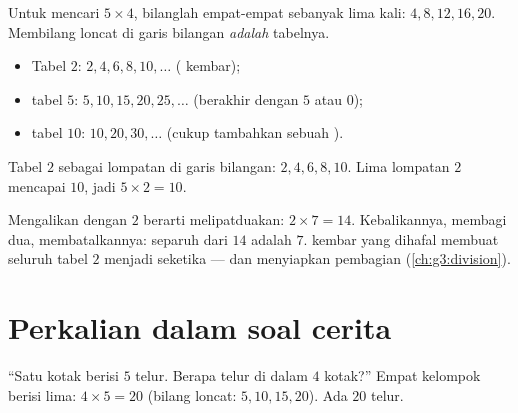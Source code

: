\begin{method}\label{met:g2:mult:skip}
Untuk mencari $5 \times 4$, bilanglah empat-empat sebanyak lima kali:
$4, 8, 12, 16, 20$. Membilang loncat di garis bilangan \emph{adalah}
tabelnya.
\begin{itemize}
  \item Tabel $2$: $2, 4, 6, 8, 10, \dots$ ( kembar);
  \item tabel $5$: $5, 10, 15, 20, 25, \dots$ (berakhir dengan $5$
        atau $0$);
  \item tabel $10$: $10, 20, 30, \dots$ (cukup tambahkan sebuah ).
\end{itemize}
\end{method}

\begin{omfigure}

{\small Tabel $2$ sebagai lompatan di garis bilangan: $2, 4, 6, 8, 10$.
Lima lompatan $2$ mencapai $10$, jadi $5 \times 2 = 10$.}
\end{omfigure}

\begin{example}\label{ex:g2:mult:double}
Mengalikan dengan $2$ berarti melipatduakan: $2 \times 7 = 14$.
Kebalikannya, membagi dua, membatalkannya: separuh dari $14$ adalah
$7$.  kembar yang dihafal membuat seluruh tabel $2$ menjadi
seketika --- dan menyiapkan pembagian (\cref{ch:g3:division}).
\end{example}

\section{Perkalian dalam soal cerita}

\begin{example}\label{ex:g2:mult:problem}
``Satu kotak berisi $5$ telur. Berapa telur di dalam $4$ kotak?''
Empat kelompok berisi lima: $4 \times 5 = 20$ (bilang loncat:
$5, 10, 15, 20$). Ada $20$ telur.
\end{example}

